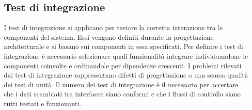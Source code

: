\subsection{Test di integrazione}
I test di integrazione si applicano per testare la corretta interazione tra le componenti del sistema. Essi vengono definiti durante la progettazione architetturale e si basano sui componenti in essa specificati.
Per definire i test di integrazione è necessario selezionare quali funzionalità integrare individuandone le componenti coinvolte e ordinandole per dipendenze crescenti.
I problemi rilevati dai test di integrazione rappresentano difetti di progettazione o una scarsa qualità dei test di unità. Il numero dei test di integrazione è il necessario per accertare che i dati scambiati tra interfacce siano conformi e che i flussi di controllo siano tutti testati e funzionanti.
